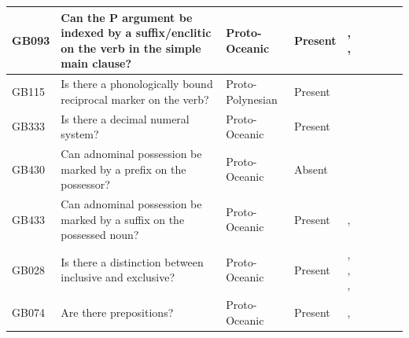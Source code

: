 \documentclass[draft,10pt]{article} %
\begin{document}
\begin{landscape}
\begin{longtable}{| p{2cm}| p{3cm}| p{2.5cm}|p{2cm}|p{2cm}|p{2cm}|p{2cm}|p{2cm}|p{2cm}|}
GB093&Can the P argument be indexed by a suffix/enclitic on the verb in the simple main clause?&Proto-Oceanic&Present&\citet[498-499]{ross2004morphosyntactic}, \citet[83]{lynchrosscrowley_proto_grammar_oceanic}, \citet[112]{evans2003study}& \cellcolor{hedvig_lightgreen!50}{True Positive} & \cellcolor{hedvig_yellow!50}{Half} & \cellcolor{hedvig_lightgreen!50}{True Positive} & \cellcolor{hedvig_lightgreen!50}{True Positive} \\ \hline
GB115&Is there a phonologically bound reciprocal marker on the verb?&Proto-Polynesian&Present&\citet[4]{marck2000_encyclo}& \cellcolor{hedvig_lightgreen!50}{True Positive} & \cellcolor{hedvig_yellow!50}{Half} & \cellcolor{hedvig_lightgreen!50}{True Positive} & \cellcolor{hedvig_lightgreen!50}{True Positive} \\ \hline
GB333&Is there a decimal numeral system?&Proto-Oceanic&Present&\citet[72]{lynchrosscrowley_proto_grammar_oceanic}& \cellcolor{hedvig_lightgreen!50}{True Positive} & \cellcolor{hedvig_yellow!50}{Half} & \cellcolor{hedvig_lightgreen!50}{True Positive} & \cellcolor{hedvig_lightgreen!50}{True Positive} \\ \hline
GB430&Can adnominal possession be marked by a prefix on the possessor?&Proto-Oceanic&Absent&\citet[511]{ross2004morphosyntactic}& \cellcolor{hedvig_lightgreen!50}{True Negative} & \cellcolor{hedvig_yellow!50}{Half} & \cellcolor{hedvig_yellow!50}{True Negative} & \cellcolor{hedvig_yellow!50}{True Negative} \\ \hline
GB433&Can adnominal possession be marked by a suffix on the possessed noun?&Proto-Oceanic&Present&\citet[495]{ross2004morphosyntactic}, \citet[155]{pawley1973some}& \cellcolor{hedvig_lightgreen!50}{True Positive} & \cellcolor{hedvig_yellow!50}{Half} & \cellcolor{hedvig_lightgreen!50}{True Positive} & \cellcolor{hedvig_lightgreen!50}{True Positive} \\ \hline
GB028&Is there a distinction between inclusive and exclusive?&Proto-Oceanic&Present&\citet[112]{pawley1973some}, \citet[184]{crowley1985common}, \citet[500]{ross2004morphosyntactic}, \citet[67, 75]{lynchrosscrowley_proto_grammar_oceanic}& \cellcolor{hedvig_lightgreen!50}{True Positive} & \cellcolor{hedvig_yellow!50}{Half} & \cellcolor{hedvig_lightgreen!50}{True Positive} & \cellcolor{hedvig_lightgreen!50}{True Positive} \\ \hline
GB074&Are there prepositions?&Proto-Oceanic&Present&\citet[167]{pawley1973some}, \citet[498]{ross2004morphosyntactic}& \cellcolor{hedvig_lightgreen!50}{True Positive} & \cellcolor{hedvig_yellow!50}{Half} & \cellcolor{hedvig_lightgreen!50}{True Positive} & \cellcolor{hedvig_lightgreen!50}{True Positive} \\ \hline

\end{longtable}
\end{landscape}
\end{document}
